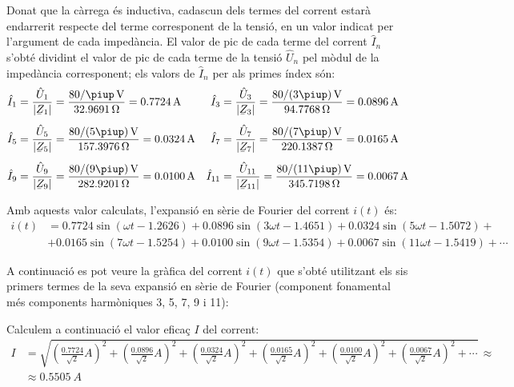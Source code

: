 \begin{exemple}
    Donat que la càrrega és inductiva, cadascun dels
    termes del corrent estarà endarrerit respecte del terme corresponent
    de la tensió, en un valor indicat per l'argument de cada impedància.
    El valor de pic de cada terme del corrent $\hat{I}_n$ s'obté
    dividint el valor de pic de cada terme de la tensió $\hat{U}_n$ pel
    mòdul de la impedància corresponent; els valors de $\hat{I}_n$ per
    als primes índex són:
    \begin{align*}
        \hat{I}_1 &= \frac{\hat{U}_1}{|\cmplx{Z}_1|} = \frac{80/\piup\unit{V}}{\SI{32,9691}{\ohm}} = \SI{0,7724}{A}
        & \hat{I}_3 &= \frac{\hat{U}_3}{|\cmplx{Z}_3|} =\frac{80/(3\piup)\unit{V}}{\SI{94,7768}{\ohm}} = \SI{0,0896}{A}\\[1ex]
        \hat{I}_5 &= \frac{\hat{U}_5}{|\cmplx{Z}_5|} =\frac{80/(5\piup)\unit{V}}{\SI{157,3976}{\ohm}} =\SI{0,0324}{A}
        & \hat{I}_7 &= \frac{\hat{U}_7}{|\cmplx{Z}_7|} =\frac{80/(7\piup)\unit{V}}{\SI{220,1387}{\ohm}} =
        \SI{0,0165}{A}\\[1ex]
        \hat{I}_9 &= \frac{\hat{U}_9}{|\cmplx{Z}_9|} =\frac{80/(9\piup)\unit{V}}{\SI{282,9201}{\ohm}} =
        \SI{0,0100}{A} & \hat{I}_{11} &= \frac{\hat{U}_{11}}{|\cmplx{Z}_{11}|} =\frac{80/(11\piup)\unit{V}}
        {\SI{345,7198}{\ohm}} =  \SI{0,0067}{A}
    \end{align*}

    Amb aquests valor calculats, l'expansió en sèrie de Fourier del
    corrent $i(t)$ és:
    \[\begin{split}
         i(t) &=  \num{0,7724} \sin(\omega t - \num{1,2626}) +  \num{0,0896} \sin(3 \omega t -
         \num{1,4651}) + \num{0,0324} \sin(5 \omega t - \num{1,5072}) +{}\\
         &+ \num{0,0165} \sin(7 \omega t - \num{1,5254}) + \num{0,0100} \sin(9 \omega t - \num{1,5354})
         + \num{0,0067} \sin(11 \omega t - \num{1,5419}) +\cdots
    \end{split}\]

    A continuació es pot veure la gràfica del corrent $i(t)$ que
    s'obté utilitzant els sis primers termes de la seva expansió en 
    sèrie de Fourier (component fonamental més components harmòniques 3, 5, 7, 9 i 11):

    \begin{center}
      
    \end{center}

    Calculem a continuació el valor eficaç $I$ del corrent:
    \[\begin{split}
        I &= \sqrt{\left(\tfrac{\num{0,7724}}{\sqrt{2}}\unit{A}\right)^2 +
            \left(\tfrac{\num{0,0896}}{\sqrt{2}}\unit{A}\right)^2 +
            \left(\tfrac{\num{0,0324}}{\sqrt{2}}\unit{A}\right)^2 +
            \left(\tfrac{\num{0,0165}}{\sqrt{2}}\unit{A}\right)^2 +
            \left(\tfrac{\num{0,0100}}{\sqrt{2}}\unit{A}\right)^2 +
            \left(\tfrac{\num{0,0067}}{\sqrt{2}}\unit{A}\right)^2 + \cdots}
            \,\approx \\[1ex]
            &\approx \SI{0,5505}{A}
    \end{split}\]


\end{exemple}
